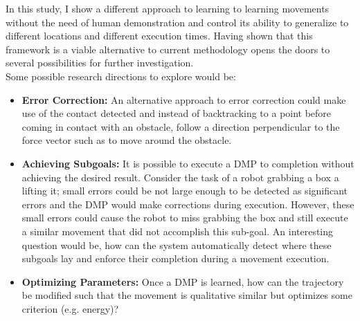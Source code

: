 \documentclass[a4paper]{article}
\begin{document}
In this study, I show a different approach to learning to learning movements without the need of human demonstration and control its ability to generalize to different locations and different execution times. Having shown that this framework is a viable alternative to current methodology opens the doors to several possibilities for further investigation. \\
\indent Some possible research directions to explore would be:
\begin{itemize}
	
	\item \textbf{Error Correction:}
	\indent An alternative approach to error correction could make use of the contact detected and instead of backtracking to a point before coming in contact with an obstacle, follow a direction perpendicular to the force vector such as to move around the obstacle. 
	
	\item \textbf{Achieving Subgoals:} It is possible to execute a DMP to completion without achieving the desired result. Consider the task of a robot grabbing a box a lifting it; small errors could be not large enough to be detected as significant errors and the DMP would make corrections during execution. However, these small errors could cause the robot to miss grabbing the box and still execute a similar movement that did not accomplish this sub-goal. An interesting question would be, how can the system automatically detect where these subgoals lay and enforce their completion during a movement execution.
	
	\item \textbf{Optimizing Parameters:} Once a DMP is learned, how can the trajectory be modified such that the movement is qualitative similar but optimizes some criterion (e.g. energy)?

\end{itemize}
  


 
\end{document}
